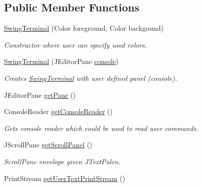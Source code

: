 \subsection*{Public Member Functions}
\begin{DoxyCompactItemize}
\item 
\hyperlink{classgov_1_1nasa_1_1jpf_1_1inspector_1_1frontends_1_1jpfshell_1_1gui_1_1_swing_terminal_aefef2b68870e85e79ff719fd0093aad4}{Swing\+Terminal} (Color foreground, Color backgound)
\begin{DoxyCompactList}\small\item\em Constructor where user can specify used colors. \end{DoxyCompactList}\item 
\hyperlink{classgov_1_1nasa_1_1jpf_1_1inspector_1_1frontends_1_1jpfshell_1_1gui_1_1_swing_terminal_a63bf7064d6699272b35dd865ef558d75}{Swing\+Terminal} (J\+Editor\+Pane \hyperlink{classgov_1_1nasa_1_1jpf_1_1inspector_1_1frontends_1_1jpfshell_1_1gui_1_1_swing_terminal_a87c9b71bc01bfcee4d8e6741aac6bc85}{console})
\begin{DoxyCompactList}\small\item\em Creates \hyperlink{classgov_1_1nasa_1_1jpf_1_1inspector_1_1frontends_1_1jpfshell_1_1gui_1_1_swing_terminal}{Swing\+Terminal} with user defined panel (console). \end{DoxyCompactList}\item 
J\+Editor\+Pane \hyperlink{classgov_1_1nasa_1_1jpf_1_1inspector_1_1frontends_1_1jpfshell_1_1gui_1_1_swing_terminal_a231a9edf7c85325dc0c9d86745de8974}{get\+Pane} ()
\item 
Console\+Reader \hyperlink{classgov_1_1nasa_1_1jpf_1_1inspector_1_1frontends_1_1jpfshell_1_1gui_1_1_swing_terminal_acd8f667f2589ec68a8634763a25b1ad4}{get\+Console\+Reader} ()
\begin{DoxyCompactList}\small\item\em Gets console reader which could be used to read user commands. \end{DoxyCompactList}\item 
J\+Scroll\+Pane \hyperlink{classgov_1_1nasa_1_1jpf_1_1inspector_1_1frontends_1_1jpfshell_1_1gui_1_1_swing_terminal_ae57441391d91dc792be3d6cc699877e5}{get\+Scroll\+Panel} ()
\begin{DoxyCompactList}\small\item\em Scroll\+Pane envelope given J\+Text\+Palen. \end{DoxyCompactList}\item 
Print\+Stream \hyperlink{classgov_1_1nasa_1_1jpf_1_1inspector_1_1frontends_1_1jpfshell_1_1gui_1_1_swing_terminal_a5cec7ed0d51341b8ff2c65090c7f7a14}{get\+User\+Text\+Print\+Stream} ()

\end{DoxyCompactItemize}
